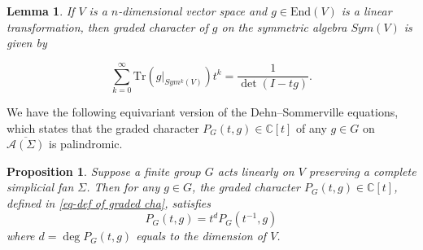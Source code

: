 \documentclass{amsart}
\newtheorem{lemma}[theorem]{Lemma}
\newtheorem{proposition}[theorem]{Proposition}
\theoremstyle{definition}
\theoremstyle{remark}
\numberwithin{equation}{section}
\begin{document}
\begin{lemma} \label{lem-sym}
If $V$ is a $n$-dimensional vector space and $g \in \text{End}(V)$ is a linear transformation, then graded character of $g$ on the symmetric algebra $Sym(V)$ is given by 

$$\sum_{k=0}^{\infty} \text{Tr}(g|_{Sym^k(V)}) t^k = \frac{1}{\det(I - tg)}.$$
\end{lemma}

We have the following equivariant version of the Dehn--Sommerville equations, which states that the graded character $
P_G(t, g)\in \mathbb{C}[t]$ of any $g \in G$ on ${\overline{\mathcal{A}(\Sigma)}}$ is palindromic. 

\begin{proposition}
Suppose a finite group $G$ acts linearly on $V$ preserving a complete simplicial fan $\Sigma$. Then for any $g \in G$, the graded character $
P_G(t, g)\in \mathbb{C}[t]$, defined in \eqref{eq-def of graded cha}, satisfies 
\begin{equation} \label{eq-PD}
 P_G(t, g)=t^d P_G(t^{-1}, g)   
\end{equation}
where $d=\operatorname{deg}P_G(t, g)$ equals to the dimension of $V$.
\end{proposition}
\end{document}
